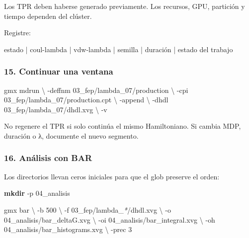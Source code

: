 \documentclass[
  spanish,
  11pt,
  a4paper]{article}
\newenvironment{Shaded}{\begin{snugshade}}{\end{snugshade}}
\newcommand{\AttributeTok}[1]{\textcolor[rgb]{0.13,0.29,0.53}{#1}}
\newcommand{\DataTypeTok}[1]{\textcolor[rgb]{0.13,0.29,0.53}{#1}}
\newcommand{\ExtensionTok}[1]{#1}
\newcommand{\FunctionTok}[1]{\textcolor[rgb]{0.13,0.29,0.53}{\textbf{#1}}}
\newcommand{\NormalTok}[1]{#1}
\newcommand{\PreprocessorTok}[1]{\textcolor[rgb]{0.56,0.35,0.01}{\textit{#1}}}
\begin{document}
Los TPR deben haberse generado previamente. Los recursos, GPU, partición
y tiempo dependen del clúster.

Registre:

\begin{Shaded}
\begin{Highlighting}[]
\NormalTok{estado | coul{-}lambda | vdw{-}lambda | semilla | duración | estado del trabajo}
\end{Highlighting}
\end{Shaded}

\subsubsection{15. Continuar una ventana}\label{continuar-una-ventana}

\begin{Shaded}
\begin{Highlighting}[]
\ExtensionTok{gmx}\NormalTok{ mdrun }\DataTypeTok{\textbackslash{}}
    \AttributeTok{{-}deffnm}\NormalTok{ 03\_fep/lambda\_07/production }\DataTypeTok{\textbackslash{}}
    \AttributeTok{{-}cpi}\NormalTok{ 03\_fep/lambda\_07/production.cpt }\DataTypeTok{\textbackslash{}}
    \AttributeTok{{-}append} \DataTypeTok{\textbackslash{}}
    \AttributeTok{{-}dhdl}\NormalTok{ 03\_fep/lambda\_07/dhdl.xvg }\DataTypeTok{\textbackslash{}}
    \AttributeTok{{-}v}
\end{Highlighting}
\end{Shaded}

No regenere el TPR si solo continúa el mismo Hamiltoniano. Si cambia
MDP, duración o λ, documente el nuevo segmento.

\subsubsection{16. Análisis con BAR}\label{anuxe1lisis-con-bar}

Los directorios llevan ceros iniciales para que el glob preserve el
orden:

\begin{Shaded}
\begin{Highlighting}[]
\FunctionTok{mkdir} \AttributeTok{{-}p}\NormalTok{ 04\_analisis}

\ExtensionTok{gmx}\NormalTok{ bar }\DataTypeTok{\textbackslash{}}
    \AttributeTok{{-}b}\NormalTok{ 500 }\DataTypeTok{\textbackslash{}}
    \AttributeTok{{-}f}\NormalTok{ 03\_fep/lambda\_}\PreprocessorTok{*}\NormalTok{/dhdl.xvg }\DataTypeTok{\textbackslash{}}
    \AttributeTok{{-}o}\NormalTok{ 04\_analisis/bar\_deltaG.xvg }\DataTypeTok{\textbackslash{}}
    \AttributeTok{{-}oi}\NormalTok{ 04\_analisis/bar\_integral.xvg }\DataTypeTok{\textbackslash{}}
    \AttributeTok{{-}oh}\NormalTok{ 04\_analisis/bar\_histograms.xvg }\DataTypeTok{\textbackslash{}}
    \AttributeTok{{-}prec}\NormalTok{ 3}
\end{Highlighting}
\end{Shaded}
\end{document}
